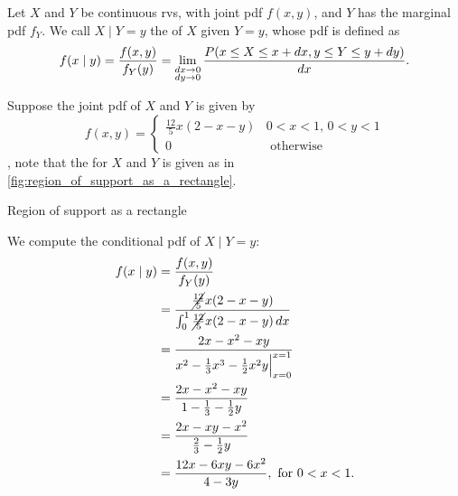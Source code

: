 \documentclass[notoc,notitlepage]{tufte-book}
\begin{document}
\begin{defn}\label{defn:conditional_distribution_of_continuous_random_variables}
  Let $X$ and $Y$ be continuous rvs, with joint pdf $f(x, y)$, and $Y$ has the
  marginal pdf $f_Y$. We call $X \mid Y = y$ the  of $X$ given $Y = y$, whose pdf is defined as
  \begin{equation*}
    f(x \mid y) = \frac{f(x, y)}{f_Y(y)} = \lim_{\substack{\mathop{}\!d{x} \to 0 \\
    \mathop{}\!d{y} \to 0}} \frac{P(x \leq X \leq x + \mathop{}\!d{x}, y \leq Y \leq y +
    \mathop{}\!d{y})}{\mathop{}\!d{x}}.
  \end{equation*}
\end{defn}

\begin{eg}
  Suppose the joint pdf of $X$ and $Y$ is given by
  \begin{equation*}
    f(x, y) = \begin{cases}
      \frac{12}{5} x (2 - x - y) & 0 < x < 1, \, 0 < y < 1 \\
      0                          & \text{ otherwise }
    \end{cases}
  \end{equation*}
  , note that the  for $X$ and $Y$ is
  given as in \cref{fig:region_of_support_as_a_rectangle}.
  \begin{marginfigure}
    \centering
    \caption{Region of support as a rectangle}\label{fig:region_of_support_as_a_rectangle}
  \end{marginfigure}
  We compute the conditional pdf of $X \mid Y = y$:
  \begin{align*}
    f(x \mid y) &= \frac{f(x,y)}{f_Y(y)} \\
                &= \frac{\cancel{\frac{12}{5}}x(2-x-y)}{\int_{0}^{1} \cancel{\frac{12}{5}}x(2-x-y)
                  \mathop{}\!d{x}} \\
                &= \frac{2x - x^2 - xy}{x^2 - \frac{1}{3}x^3 - \frac{1}{2}x^2 y
                  \Big|_{x=0}^{x=1}} \\
                &= \frac{2x - x^2 - xy}{1 - \frac{1}{3} - \frac{1}{2} y} \\
                &= \frac{2x - xy - x^2}{\frac{2}{3} - \frac{1}{2} y} \\
                &= \frac{12x - 6xy - 6x^2}{4 - 3y}, \text{ for } 0 < x < 1.
  \end{align*}
\end{eg}



\appendix

\backmatter

\fancyhead[LE]{\thepage \enspace \textsl{\leftmark}}



\printindex
\end{document}

